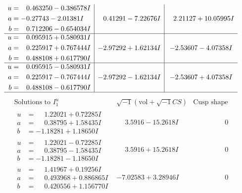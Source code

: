 \documentclass[1p]{elsarticle_modified}
\theoremstyle{definition}
\newcommand{\I}{\sqrt{-1}}
\begin{document}
$$\begin{array}{c|c|c}
\begin{aligned}
u &= \phantom{-}0.463250 - 0.386578 I \\
a &= -0.27743 - 2.01381 I \\
b &= \phantom{-}0.712206 - 0.654034 I\end{aligned}
 & \phantom{-}0.41291 - 7.22676 I & \phantom{-}2.21127 + 10.05995 I \\ \hline\begin{aligned}
u &= \phantom{-}0.095915 + 0.580931 I \\
a &= \phantom{-}0.225917 + 0.767444 I \\
b &= \phantom{-}0.488108 + 0.617790 I\end{aligned}
 & -2.97292 + 1.62134 I & -2.53607 - 4.07358 I \\ \hline\begin{aligned}
u &= \phantom{-}0.095915 - 0.580931 I \\
a &= \phantom{-}0.225917 - 0.767444 I \\
b &= \phantom{-}0.488108 - 0.617790 I\end{aligned}
 & -2.97292 - 1.62134 I & -2.53607 + 4.07358 I\\
 \hline 
 \end{array}$$\newpage$$\begin{array}{c|c|c}  
\text{Solutions to }I^u_{1}& \I (\text{vol} + \sqrt{-1}CS) & \text{Cusp shape}\\
 \hline 
\begin{aligned}
u &= \phantom{-}1.22021 + 0.72285 I \\
a &= \phantom{-}0.38795 + 1.58435 I \\
b &= -1.18281 + 1.18650 I\end{aligned}
 & \phantom{-}3.5916 - 15.2618 I & \phantom{-0.000000 } 0 \\ \hline\begin{aligned}
u &= \phantom{-}1.22021 - 0.72285 I \\
a &= \phantom{-}0.38795 - 1.58435 I \\
b &= -1.18281 - 1.18650 I\end{aligned}
 & \phantom{-}3.5916 + 15.2618 I & \phantom{-0.000000 } 0 \\ \hline\begin{aligned}
u &= \phantom{-}1.41967 + 0.19256 I \\
a &= \phantom{-}0.493968 + 0.886865 I \\
b &= \phantom{-}0.420556 + 1.156770 I\end{aligned}
 & -7.02583 + 3.28946 I & \phantom{-0.000000 } 0 \\ \hline\begin{aligned}

\end{aligned}
\end{array}$$
\end{document}
